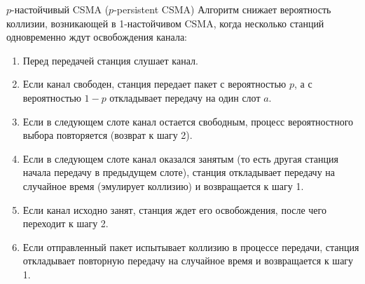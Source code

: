 \begin{definition}{$p$-настойчивый CSMA ($p$-persistent CSMA)}
    Алгоритм снижает вероятность коллизии, возникающей в 1-настойчивом CSMA, когда несколько станций одновременно ждут освобождения канала:
    \begin{enumerate}
        \item Перед передачей станция слушает канал.
        \item Если канал свободен, станция передает пакет с вероятностью $p$, а с вероятностью $1 - p$ откладывает передачу на один слот $a$.
        \item Если в следующем слоте канал остается свободным, процесс вероятностного выбора повторяется (возврат к шагу 2).
        \item Если в следующем слоте канал оказался занятым (то есть другая станция начала передачу в предыдущем слоте), станция откладывает передачу на случайное время (эмулирует коллизию) и возвращается к шагу 1.
        \item Если канал исходно занят, станция ждет его освобождения, после чего переходит к шагу 2.
        \item Если отправленный пакет испытывает коллизию в процессе передачи, станция откладывает повторную передачу на случайное время и возвращается к шагу 1.
    \end{enumerate}

    \begin{center}
\end{center}
\end{definition}
